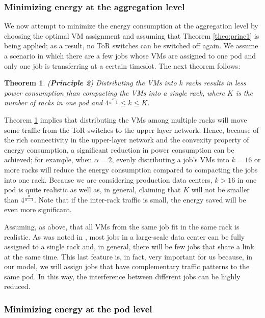 \documentclass[journal,single-space,two column,twoside,10pt]{IEEEtran}
\newtheorem{theorem}{Theorem}
\begin{document}
\subsubsection{Minimizing energy at the aggregation level}

We now attempt to minimize the energy consumption at the aggregation level by choosing the optimal VM assignment and assuming that Theorem \ref{theo:princ1} is being applied; as a result, no ToR switches can be switched off again.
We assume a scenario in which there are a few jobs whose VMs are assigned to one pod and only one job is transferring at a certain timeslot. The next theorem follows:
\begin{theorem}
\label{theo:prin2}
(\textbf{Principle 2}) Distributing the VMs into $k$ racks results in less power consumption than compacting the VMs into a single rack, where $K$ is the number of racks in one pod and $4^{\frac{\alpha}{\alpha - 1}} \leq k \leq K$.
\end{theorem}

Theorem \ref{theo:prin2} implies that distributing the VMs among multiple racks will move some traffic from the ToR switches to the upper-layer network. Hence, because of the rich connectivity in the upper-layer network and the convexity property of energy consumption, a significant reduction in power consumption can be achieved; for example, when $\alpha = 2$, evenly distributing a job's VMs into $k=16$ or more racks will reduce the energy consumption compared to compacting the jobs into one rack. Because we are considering production data centers, $k>16$ in one pod is quite realistic as well as, in general, claiming that $K$ will not be smaller than $4^{\frac{\alpha}{\alpha - 1}}$. Note that if the inter-rack traffic is small, the energy saved will be even more significant.

Assuming, as above, that all VMs from the same job fit in the same rack is realistic. As was noted in \cite{Xie_Ding-2012}, most jobs in a large-scale data center can be fully assigned to a single rack and, in general, there will be few jobs that share a link at the same time. This last feature is, in fact, very important for us because, in our model, we will assign jobs that have complementary traffic patterns to the same pod. In this way, the interference between different jobs can be highly reduced.

\subsubsection{\textcolor{black}{Minimizing energy at the pod level}}
\end{document}
